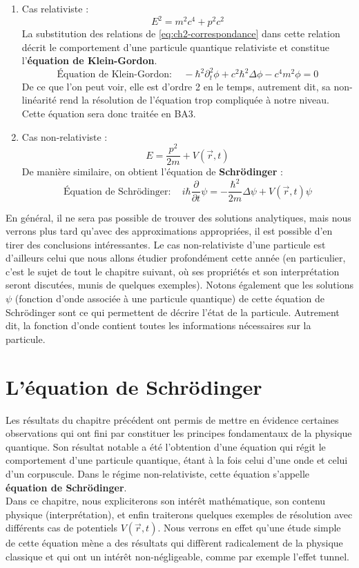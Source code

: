 \documentclass[12pt, a4paper]{book}
\begin{document}
\begin{enumerate}[label =  (\alph*)]
\begin{enumerate}[label = \roman*)]
\item Cas relativiste : 
$$E^2 = m^2 c^4 + p^2 c^2$$
La substitution des relations de \eqref{eq:ch2-correspondance} dans cette relation décrit le comportement d'une particule quantique relativiste et constitue l'\textbf{équation de Klein-Gordon}.
\begin{equation} \label{eq:dirac}
\boxed{\text{Équation de Klein-Gordon} : \quad -\hbar ^2 \partial_t ^2 \phi + c^2 \hbar ^2 \Delta \phi - c^4 m^2 \phi = 0}
\end{equation}
De ce que l'on peut voir, elle est d'ordre 2 en le temps, autrement dit, sa non-linéarité rend la résolution de l'équation trop compliquée à notre niveau. Cette équation sera donc traitée en BA3.
\item Cas non-relativiste :
$$E = \dfrac{p^2}{2m} + V(\vec r, t)$$
De manière similaire, on obtient l'équation de \textbf{Schrödinger} :
\begin{equation} 
\boxed{\text{Équation de Schrödinger} : \quad
i\hbar \dfrac{\partial}{\partial t} \psi = -\dfrac{\hbar ^2}{2m} \Delta \psi + V(\vec r, t) \psi}
\end{equation}

\end{enumerate}
\end{enumerate}
En général, il ne sera pas possible de trouver des solutions analytiques, mais nous verrons plus tard qu'avec des approximations appropriées, il est possible
d'en tirer des conclusions intéressantes. Le cas non-relativiste d'une particule est d'ailleurs celui que nous allons étudier profondément cette année (en particulier, c'est le sujet de tout le chapitre suivant, où ses propriétés et son interprétation seront discutées, munis de quelques exemples).
Notons également que les solutions $\psi$ (fonction d'onde associée à une particule quantique) de cette équation de Schrödinger sont ce qui permettent de décrire l'état de la particule. Autrement dit, la fonction d'onde contient toutes les informations nécessaires sur la particule. 

\chapter{L'équation de Schrödinger}
Les résultats du chapitre précédent ont permis de mettre en évidence certaines observations qui ont fini par constituer les principes fondamentaux de la physique quantique. Son résultat notable a été l'obtention d'une équation qui régit le comportement d'une particule quantique, étant à la fois celui d'une onde et celui d'un corpuscule. Dans le régime non-relativiste, cette équation s'appelle \textbf{équation de Schrödinger}. \\
Dans ce chapitre, nous expliciterons son intérêt mathématique, son contenu physique (interprétation), et enfin traiterons quelques exemples de résolution avec différents cas de potentiels $V(\vec{r},t)$. Nous verrons en effet qu'une étude simple de cette équation mène a des résultats qui diffèrent radicalement de la physique classique et qui ont un intérêt non-négligeable, comme par exemple l'effet tunnel. 
\end{document}
